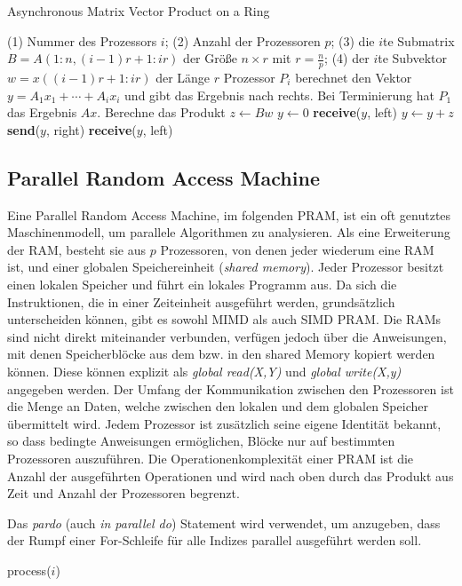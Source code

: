 \begin{algorithm}
    \caption{Asynchronous Matrix Vector Product on a Ring \cite[S.18]{jaja}}
    \begin{algorithmic}[1]
    \Require (1) Nummer des Prozessors $i$; (2) Anzahl der Prozessoren $p$;
    (3) die $i$te Submatrix $B = A(1:n, (i-1)r+1:ir)$ der Größe $n \times r$
        mit $r = \frac{n}{p}$;
    (4) der $i$te Subvektor $w = x((i-1)r+1:ir)$ der Länge $r$
    \Ensure Prozessor $P_i$ berechnet den Vektor $y = A_1x_1 + \cdots + A_ix_i$
    und gibt das Ergebnis nach rechts. Bei Terminierung hat $P_1$ das
    Ergebnis $Ax$.
    \State Berechne das Produkt $z \gets Bw$
        \State $y \gets 0$
    \Else
        \State \textbf{receive}($y$, left)
    \EndIf
    \State $y \gets y + z$
    \State \textbf{send}($y$, right)
        \State \textbf{receive}($y$, left)
    \EndIf
    \end{algorithmic}
\end{algorithm}


\subsection{Parallel Random Access Machine}
Eine Parallel Random Access Machine, im folgenden PRAM, ist ein oft genutztes
Maschinenmodell, um parallele Algorithmen zu analysieren.
Als eine Erweiterung der RAM, besteht sie aus $p$ Prozessoren, von denen jeder
wiederum eine RAM ist, und einer globalen Speichereinheit
(\emph{shared memory}).
Jeder Prozessor besitzt einen lokalen Speicher und führt ein lokales Programm
aus.
Da sich die Instruktionen, die in einer Zeiteinheit ausgeführt werden,
grundsätzlich unterscheiden können, gibt es sowohl MIMD als auch SIMD PRAM.
Die RAMs sind nicht direkt miteinander verbunden, verfügen jedoch über die
Anweisungen, mit denen Speicherblöcke aus dem bzw. in den shared Memory kopiert
werden können.
Diese können explizit als \emph{global read(X,Y)} und \emph{global write(X,y)}
angegeben werden.
Der Umfang der Kommunikation zwischen den Prozessoren ist die Menge an Daten,
welche zwischen den lokalen und dem globalen Speicher übermittelt wird.
Jedem Prozessor ist zusätzlich seine eigene Identität bekannt, so dass bedingte
Anweisungen ermöglichen, Blöcke nur auf bestimmten Prozessoren auszuführen.
Die Operationenkomplexität einer PRAM ist die Anzahl der ausgeführten
Operationen und wird nach oben durch das Produkt aus Zeit und Anzahl der
Prozessoren begrenzt.
\cite[S.9ff.]{jaja}

Das \emph{pardo} (auch \emph{in parallel do}) Statement wird verwendet, um
anzugeben, dass der Rumpf einer For-Schleife für alle Indizes parallel
ausgeführt werden soll.
\begin{algorithmic}
        \State process($i$)
    \EndParDo
\end{algorithmic}

